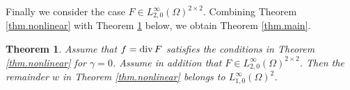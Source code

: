 \documentclass[11pt,a4paper]{article}
\newtheorem{theorem}{Theorem }[section]
\begin{document}
Finally we consider the case $F\in L^\infty_{2,0}(\Omega)^{2\times 2}$. Combining Theorem \ref{thm.nonlinear} 
with Theorem \ref{thm.nonlinear'} below, we obtain Theorem \ref{thm.main}. 


\begin{theorem}\label{thm.nonlinear'} 
Assume that $f={\rm div}\, F$ satisfies the conditions in Theorem \ref{thm.nonlinear} for $\gamma=0$. 
Assume in addition that $F\in L^\infty_{2,0}(\Omega)^{2\times 2}$.
Then the remainder $w$ in Theorem \ref{thm.nonlinear} belongs to $L^\infty_{1,0} (\Omega)^2$.
\end{theorem}

\end{document}
